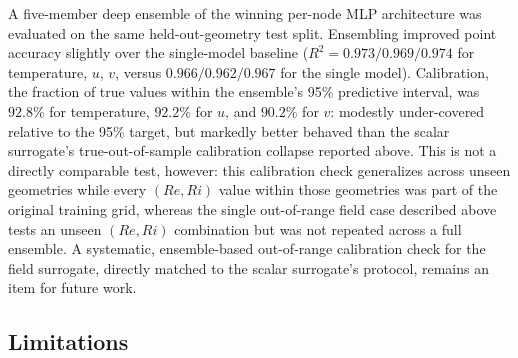 A five-member deep ensemble of the winning per-node MLP architecture was evaluated on the same held-out-geometry test split. Ensembling improved point accuracy slightly over the single-model baseline ($R^2 = 0.973/0.969/0.974$ for temperature, $u$, $v$, versus $0.966/0.962/0.967$ for the single model). Calibration, the fraction of true values within the ensemble's 95\% predictive interval, was $92.8\%$ for temperature, $92.2\%$ for $u$, and $90.2\%$ for $v$: modestly under-covered relative to the 95\% target, but markedly better behaved than the scalar surrogate's true-out-of-sample calibration collapse reported above. This is not a directly comparable test, however: this calibration check generalizes across unseen geometries while every $(Re,Ri)$ value within those geometries was part of the original training grid, whereas the single out-of-range field case described above tests an unseen $(Re,Ri)$ combination but was not repeated across a full ensemble. A systematic, ensemble-based out-of-range calibration check for the field surrogate, directly matched to the scalar surrogate's protocol, remains an item for future work.

\subsection{Limitations}
\label{sec:limitations}

